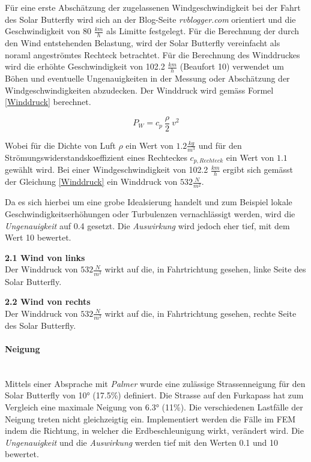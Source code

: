   Für eine erste Abschätzung der zugelassenen Windgeschwindigkeit bei der Fahrt des Solar Butterfly wird sich an der Blog-Seite \emph{rvblogger.com} orientiert und die Geschwindigkeit von 80 $\frac{km}{h}$ als Limitte festgelegt. Für die Berechnung der durch den Wind entstehenden Belastung, wird der Solar Butterfly vereinfacht als noraml angeströmtes Rechteck betrachtet. Für die Berechnung des Winddruckes wird die erhöhte Geschwindigkeit von 102.2 $\frac{km}{h}$ (Beaufort 10) verwendet um Böhen und eventuelle Ungenauigkeiten in der Messung oder Abschätzung der Windgeschwindigkeiten abzudecken. Der Winddruck wird gemäss Formel \ref{Winddruck} berechnet.

  \begin{equation}
    \label{Winddruck}
    P_W = c_p \: \frac{\rho}{2}\: v^2
  \end{equation}

  Wobei für die Dichte von Luft $\rho$ ein Wert von $1.2 \frac{kg}{m^3}$ und für den Strömungswiderstandskoeffizient eines Rechteckes $c_{p,Rechteck}$ ein Wert von $1.1$ gewählt wird. Bei einer Windgeschwindigkeit von 102.2 $\frac{km}{h}$ ergibt sich gemässt der Gleichung \ref{Winddruck} ein Winddruck von $532 \frac{N}{m^2}$.

  Da es sich hierbei um eine grobe Idealsierung handelt und zum Beispiel lokale Geschwindigkeitserhöhungen oder Turbulenzen vernachlässigt werden, wird die \emph{Ungenauigkeit} auf 0.4 gesetzt. Die \emph{Auswirkung} wird jedoch eher tief, mit dem Wert 10 bewertet.

  \begin{description}
    \item \textbf{2.1 Wind von links}\\ Der Winddruck von $532 \frac{N}{m^2}$ wirkt auf die, in Fahrtrichtung gesehen, linke Seite des Solar Butterfly.
    \item \textbf{2.2 Wind von rechts}\\ Der Winddruck von $532 \frac{N}{m^2}$ wirkt auf die, in Fahrtrichtung gesehen, rechte Seite des Solar Butterfly.
  \end{description}

  \paragraph{Neigung}\mbox{}\\
  Mittels einer Absprache mit \emph{Palmer} wurde eine zulässige Strassenneigung für den Solar Butterfly von 10° (17.5\%) definiert. Die Strasse auf den Furkapass hat zum Vergleich eine maximale Neigung von 6.3° (11\%). Die verschiedenen Lastfälle der Neigung treten nicht gleichzeigtig ein. Implementiert werden die Fälle im FEM indem die Richtung, in welcher die Erdbeschleunigung wirkt, verändert wird. Die \emph{Ungenauigkeit} und die \emph{Auswirkung} werden tief mit den Werten 0.1  und 10 bewertet.

